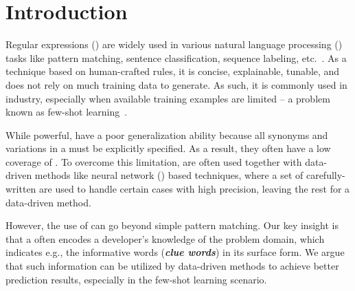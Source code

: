 \section{Introduction}


Regular expressions (\REs) are widely used in various natural language processing (\NLP) tasks like pattern matching, sentence
classification, sequence labeling, etc.~\cite{chang2014tokensregex}.
As a technique based on human-crafted rules, it is concise, explainable, tunable, and does not rely on much training data to generate. As
such, it is commonly used in industry, especially when available training examples are limited -- a problem known as few-shot
learning~\cite{gc2015big}.

While powerful, \REs have a poor generalization ability because all synonyms and variations in a \RE must be explicitly specified. As a
result, they often have a low coverage of . To overcome this limitation, \REs are often used together with
data-driven methods like neural network (\NN) based techniques, where a set of carefully-written \REs are used to handle certain cases with
high precision, leaving the rest for a data-driven method.

However, the use of \REs can go beyond simple pattern matching.
Our key insight is that a \RE often encodes a developer's knowledge of the problem domain, which indicates e.g., the informative words
(\textbf{\textit{clue
words}}) in its surface form. %
We argue that such information can be utilized by data-driven methods to achieve better prediction results, especially in the few-shot
learning scenario.





